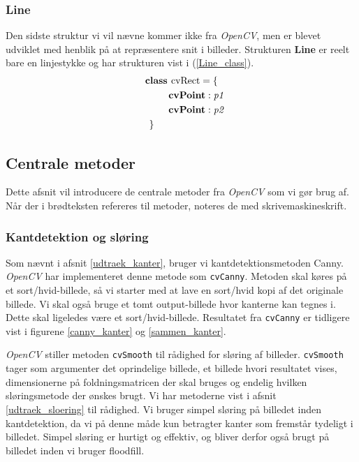{\subsubsection{Line}
Den sidste struktur vi vil nævne kommer ikke fra \emph{OpenCV}, men er
blevet udviklet med henblik på at repræsentere snit i billeder.
Strukturen \textbf{Line} er reelt bare en linjestykke og har strukturen
vist i (\ref{Line_class}).
\begin{multline}
    \textbf{class~} \textrm{cvRect} = \{ \\
    \shoveleft{\qquad\textbf{cvPoint} : \textit{p1}} \\
    \shoveleft{\qquad\textbf{cvPoint} : \textit{p2}} \\
    \shoveleft{\}}\shoveright{}
    \label{Line_class}
\end{multline}

\subsection{Centrale metoder}
Dette afsnit vil introducere de centrale metoder fra \emph{OpenCV} som
vi gør brug af.  Når der i brødteksten refereres til metoder, noteres de
med skrivemaskineskrift.

\subsubsection{Kantdetektion og sløring}
Som nævnt i afsnit \ref{udtraek_kanter}, bruger vi kantdetektionsmetoden
Canny. \emph{OpenCV} har implementeret denne metode som
\texttt{cvCanny}. Metoden skal køres på et sort/hvid-billede, så vi
starter med at lave en sort/hvid kopi af det originale billede. Vi skal
også bruge et tomt output-billede hvor kanterne kan tegnes i. Dette skal
ligeledes være et sort/hvid-billede. Resultatet fra \texttt{cvCanny} er
tidligere vist i figurene \ref{canny_kanter} og \ref{sammen_kanter}.

\emph{OpenCV} stiller metoden \texttt{cvSmooth} til rådighed for sløring
af billeder. \texttt{cvSmooth} tager som argumenter det oprindelige
billede, et billede hvori resultatet vises, dimensionerne på
foldningsmatricen der skal bruges og endelig hvilken sløringsmetode der
ønskes brugt. Vi har metoderne vist i afsnit \ref{udtraek_sloering} til
rådighed. Vi bruger simpel sløring på billedet inden kantdetektion, da
vi på denne måde kun betragter kanter som fremstår tydeligt i billedet.
Simpel sløring er hurtigt og effektiv, og bliver derfor også brugt på
billedet inden vi bruger floodfill.

}
